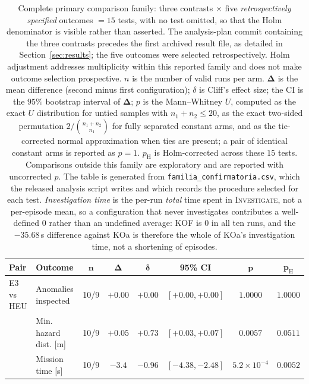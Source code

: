 \begin{table}[t]
\centering
\caption{Complete primary comparison family: three contrasts $\times$ five
\emph{retrospectively specified} outcomes $=15$ tests, with no test omitted, so that the Holm
denominator is visible rather than asserted. The analysis-plan commit containing the
three contrasts precedes the first archived result file, as detailed in
Section~\ref{sec:results}; the five outcomes were selected retrospectively. Holm
adjustment addresses multiplicity within this reported family and does not make
outcome selection prospective. $n$ is the number of valid runs per
arm. $\bm{\Delta}$ is the mean difference (second minus first configuration); $\delta$
is Cliff's effect size; the CI is the $95\%$ bootstrap interval of $\bm{\Delta}$; $p$
is the Mann--Whitney $U$, computed as the exact $U$ distribution for untied
samples with $n_1+n_2\le20$, as the exact two-sided permutation
$2/\binom{n_1+n_2}{n_1}$ for fully separated constant arms, and as the
tie-corrected normal approximation when ties are present; a pair of identical
constant arms is reported as $p=1$. $p_{\mathrm{H}}$ is Holm-corrected across
these $15$ tests. Comparisons outside this family are exploratory and are
reported with uncorrected $p$. The table is generated from
\texttt{familia\_confirmatoria.csv}, which the released analysis script writes
and which records the procedure selected for each test. \emph{Investigation time}
is the per-run \emph{total} time spent in \textsc{Investigate}, not a per-episode
mean, so a configuration that never investigates contributes a well-defined $0$
rather than an undefined average: KOF is $0$ in all ten runs, and the
$-35.68$\,s difference against KOa is therefore the whole of KOa's investigation
time, not a shortening of episodes.}
\label{tab:stats}
\footnotesize
\setlength{\tabcolsep}{4pt}
\begin{tabular}{llcccccc}
\hline
\textbf{Pair} & \textbf{Outcome} & $\bm{n}$ & $\bm{\Delta}$ & $\bm{\delta}$ &
\textbf{95\% CI} & $\bm{p}$ & $\bm{p_{\mathrm{H}}}$\\
\hline
E3 vs HEU     & Anomalies inspected       & 10/9 & $+0.00$ & $+0.00$ & $[+0.00,+0.00]$ & $1.0000$ & $1.0000$\\
              & Min. hazard dist. [m]     & 10/9 & $+0.05$ & $+0.73$ & $[+0.03,+0.07]$ & $0.0057$ & $0.0511$\\
              & Mission time [s]          & 10/9 & $-3.4$ & $-0.96$ & $[-4.38,-2.48]$ & $5.2{\times}10^{-4}$ & $0.0052$\\

\end{tabular}
\end{table}

